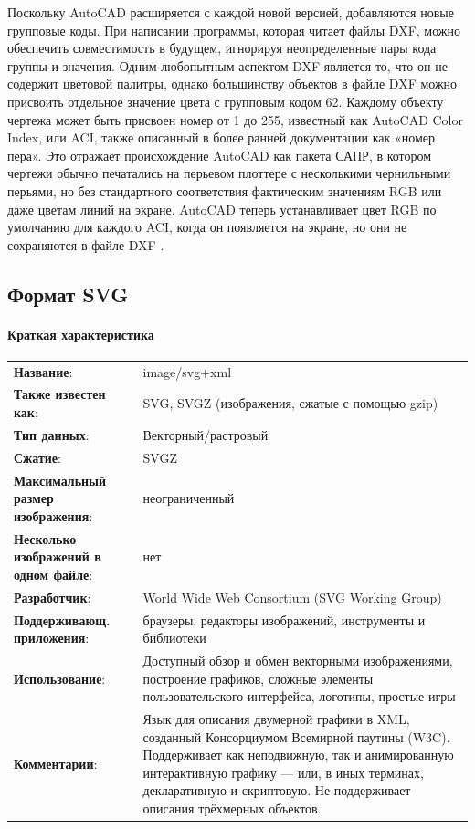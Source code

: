 Поскольку AutoCAD расширяется с каждой новой версией, добавляются новые групповые коды. При написании программы, которая читает файлы DXF, можно обеспечить совместимость в будущем, игнорируя неопределенные пары кода группы и значения.
Одним любопытным аспектом DXF является то, что он не содержит цветовой палитры, однако большинству объектов в файле DXF можно присвоить отдельное значение цвета с групповым кодом 62. Каждому объекту чертежа может быть присвоен номер от 1 до 255, известный как AutoCAD Color Index, или ACI, также описанный в более ранней документации как «номер пера». Это отражает происхождение AutoCAD как пакета САПР, в котором чертежи обычно печатались на перьевом плоттере с несколькими чернильными перьями, но без стандартного соответствия фактическим значениям RGB или даже цветам линий на экране. AutoCAD теперь устанавливает цвет RGB по умолчанию для каждого ACI, когда он появляется на экране, но они не сохраняются в файле DXF \cite{murray1996encyclopedia}.

\subsection{Формат SVG} \label{subs:svg}
\paragraph{Краткая характеристика}

\begin{longtable}{p{110pt} p{340pt}}
	\label{tab:svg}
	\centering
	\textbf{Название}:&image/svg+xml\\
	\textbf{Также известен как}:&SVG, SVGZ (изображения, сжатые с помощью gzip)\\
	\textbf{Тип данных}:&Векторный/растровый\\
	\textbf{Сжатие}:&SVGZ\\
	\textbf{Максимальный размер изображения}:&неограниченный\\
	\textbf{Несколько изображений в одном файле}:&нет\\
	\textbf{Разработчик}:&World Wide Web Consortium (SVG Working Group)\\
	\textbf{Поддерживающ. приложения}:&браузеры, редакторы изображений, инструменты и библиотеки\\
	\textbf{Использование}:&Доступный обзор и обмен векторными изображениями, построение графиков, сложные элементы пользовательского интерфейса, логотипы, простые игры\\
	\textbf{Комментарии}:&Язык для описания двумерной графики в XML, созданный Консорциумом Всемирной паутины (W3C). Поддерживает как неподвижную, так и анимированную интерактивную графику — или, в иных терминах, декларативную и скриптовую. Не поддерживает описания трёхмерных объектов.\\
\end{longtable}


